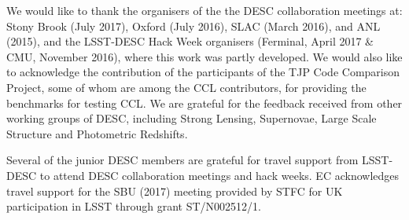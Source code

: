 % 
We would like to thank the organisers of the the DESC collaboration meetings at:
Stony Brook (July 2017), Oxford (July 2016), SLAC (March 2016), and ANL (2015), 
and the LSST-DESC Hack Week organisers (Ferminal, April 2017 \& CMU, November 2016), 
where this work was partly developed. We would also like to acknowledge the
contribution of the participants of the TJP Code Comparison Project, some of whom
are among the CCL contributors, for providing the benchmarks for 
testing CCL. We are grateful for the feedback received from
other working groups of DESC, including Strong Lensing, Supernovae, Large Scale
Structure and Photometric Redshifts.

Several of the junior DESC members are grateful for travel support from
LSST-DESC to attend DESC collaboration meetings and hack weeks.
EC acknowledges travel support for the SBU (2017) meeting 
provided by STFC for UK participation in LSST through grant ST/N002512/1.
% 
